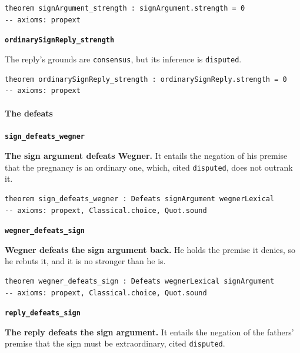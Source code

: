 \documentclass[11pt]{article}
\begin{document}
{\small\begin{verbatim}
theorem signArgument_strength : signArgument.strength = 0
-- axioms: propext
\end{verbatim}}
\par\medskip\noindent\textbf{\texttt{ordinary\allowbreak{}Sign\allowbreak{}Reply\_\allowbreak{}strength}}\par\nobreak\noindent
The reply’s grounds are \texttt{consensus}, but its inference is \texttt{disputed}.

{\small\begin{verbatim}
theorem ordinarySignReply_strength : ordinarySignReply.strength = 0
-- axioms: propext
\end{verbatim}}
\paragraph*{The defeats}
\leavevmode\par\nobreak
\par\medskip\noindent\textbf{\texttt{sign\_\allowbreak{}defeats\_\allowbreak{}wegner}}\par\nobreak\noindent
\textbf{The sign argument defeats Wegner.} It entails the negation of his premise that the pregnancy is an ordinary one, which, cited \texttt{disputed}, does not outrank it.

{\small\begin{verbatim}
theorem sign_defeats_wegner : Defeats signArgument wegnerLexical
-- axioms: propext, Classical.choice, Quot.sound
\end{verbatim}}
\par\medskip\noindent\textbf{\texttt{wegner\_\allowbreak{}defeats\_\allowbreak{}sign}}\par\nobreak\noindent
\textbf{Wegner defeats the sign argument back.} He holds the premise it denies, so he rebuts it, and it is no stronger than he is.

{\small\begin{verbatim}
theorem wegner_defeats_sign : Defeats wegnerLexical signArgument
-- axioms: propext, Classical.choice, Quot.sound
\end{verbatim}}
\par\medskip\noindent\textbf{\texttt{reply\_\allowbreak{}defeats\_\allowbreak{}sign}}\par\nobreak\noindent
\textbf{The reply defeats the sign argument.} It entails the negation of the fathers’ premise that the sign must be extraordinary, cited \texttt{disputed}.
\end{document}
